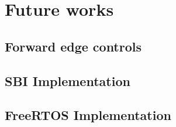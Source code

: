 \chapter{Future works}
\label{cha:Future}

\lipsum[1]

\section{Forward edge controls}
\label{cha:Future_Forward-edge-controls}

\lipsum[1]

\section{SBI Implementation}
\label{cha:Future_SBI-Implementation}

\lipsum[1]

\section{FreeRTOS Implementation}
\label{cha:Future_FreeRTOS-Implementation}

\lipsum[1]